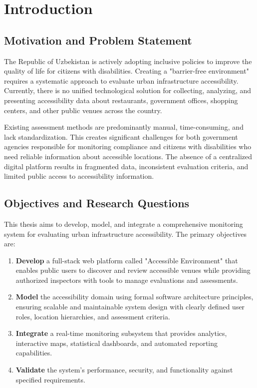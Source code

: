 \documentclass[a4paper,12pt,oneside]{book}
\begin{document}
\setcounter{tocdepth}{0}
\tableofcontents

\chapter{Introduction}
\section{Motivation and Problem Statement}
The Republic of Uzbekistan is actively adopting inclusive policies to improve the quality of life for citizens with disabilities. Creating a "barrier-free environment" requires a systematic approach to evaluate urban infrastructure accessibility. Currently, there is no unified technological solution for collecting, analyzing, and presenting accessibility data about restaurants, government offices, shopping centers, and other public venues across the country.

Existing assessment methods are predominantly manual, time-consuming, and lack standardization. This creates significant challenges for both government agencies responsible for monitoring compliance and citizens with disabilities who need reliable information about accessible locations. The absence of a centralized digital platform results in fragmented data, inconsistent evaluation criteria, and limited public access to accessibility information.

\section{Objectives and Research Questions}
This thesis aims to develop, model, and integrate a comprehensive monitoring system for evaluating urban infrastructure accessibility. The primary objectives are:

\begin{enumerate}[noitemsep]
    \item \textbf{Develop} a full-stack web platform called "Accessible Environment" that enables public users to discover and review accessible venues while providing authorized inspectors with tools to manage evaluations and assessments.
    \item \textbf{Model} the accessibility domain using formal software architecture principles, ensuring scalable and maintainable system design with clearly defined user roles, location hierarchies, and assessment criteria.
    \item \textbf{Integrate} a real-time monitoring subsystem that provides analytics, interactive maps, statistical dashboards, and automated reporting capabilities.
    \item \textbf{Validate} the system's performance, security, and functionality against specified requirements.
\end{enumerate}
\end{document}
